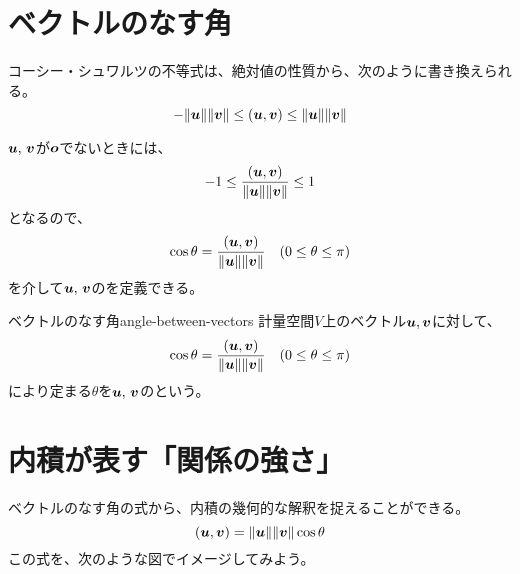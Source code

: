 \documentclass[../../../topic_linear-algebra]{subfiles}
\begin{document}
\sectionline
\section{ベクトルのなす角}

コーシー・シュワルツの不等式は、絶対値の性質から、次のように書き換えられる。
\begin{equation*}
  - \| \vb*{u} \| \| \vb*{v} \| \leq (\vb*{u}, \vb*{v}) \leq \| \vb*{u} \| \| \vb*{v} \|
\end{equation*}

$\vb*{u},\,\vb*{v}$が$\vb*{o}$でないときには、
\begin{equation*}
  -1 \leq \frac{(\vb*{u}, \vb*{v})}{\|\vb*{u}\| \|\vb*{v}\|} \leq 1
\end{equation*}
となるので、
\begin{equation*}
  \cos \theta = \frac{(\vb*{u}, \vb*{v})}{\|\vb*{u}\| \|\vb*{v}\|} \quad (0 \leq \theta \leq \pi)
\end{equation*}
を介して$\vb*{u},\,\vb*{v}$のを定義できる。

\begin{definition}{ベクトルのなす角}{angle-between-vectors}
  計量空間$V$上のベクトル$\vb*{u},\vb*{v}$に対して、
  \begin{equation*}
    \cos \theta = \frac{(\vb*{u}, \vb*{v})}{\|\vb*{u}\| \|\vb*{v}\|} \quad (0 \leq \theta \leq \pi)
  \end{equation*}
  により定まる$\theta$を$\vb*{u},\,\vb*{v}$のという。
\end{definition}

\sectionline
\section{内積が表す「関係の強さ」}\label{sec:inner-product-similarity}

ベクトルのなす角の式から、内積の幾何的な解釈を捉えることができる。
\begin{equation*}
  (\vb*{u}, \vb*{v}) = \| \vb*{u} \| \| \vb*{v} \| \cos \theta
\end{equation*}
この式を、次のような図でイメージしてみよう。
\end{document}
